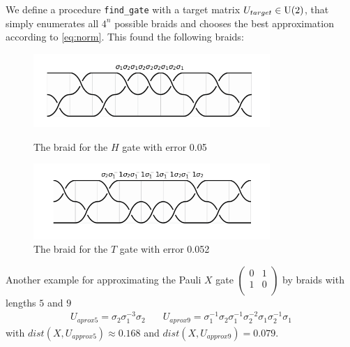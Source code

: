 \documentclass{article}
\begin{document}
We define a procedure \texttt{find_gate} with a target matrix $U_{target} \in \mathrm{U}(2)$, that simply enumerates all $4^n$ possible braids and chooses the best approximation according to \cref{eq:norm}. This found the following braids:
\setcounter{figure}{2}
\begin{figure}[h!]
  \centering
  \begin{minipage}{0.45\textwidth}
    \centering
      \includegraphics[width=0.8\textwidth]{H_braid.png}
      \caption{The braid for the $H$ gate with error 0.05}
      \label{fig:hbraid}
  \end{minipage}
  \hfill
  \begin{minipage}{0.45\textwidth}
      \centering
      \includegraphics[width=0.8\textwidth]{T_braid2.png}
      \caption{The braid for the $T$ gate with error 0.052}
      \label{fig:tbraid}
  \end{minipage}
\end{figure}

Another example for approximating the Pauli $X$ gate $\begin{pmatrix}
  0 &  1 \\
  1 &  0 \\
\end{pmatrix}$ by braids with lengths $5$ and $9$
\begin{align*}
  U_{aprox5} = \sigma_2 \sigma_1^{-3} \sigma_2 &\quad U_{aprox9} = \sigma_1^{-1}\sigma_2\sigma_1^{-1}\sigma_2^{-2}\sigma_1\sigma_2^{-1}\sigma_{1}
\end{align*}
with $dist(X,U_{approx5}) \approx 0.168$ and $dist(X,U_{approx9}) = 0.079$.
\end{document}
